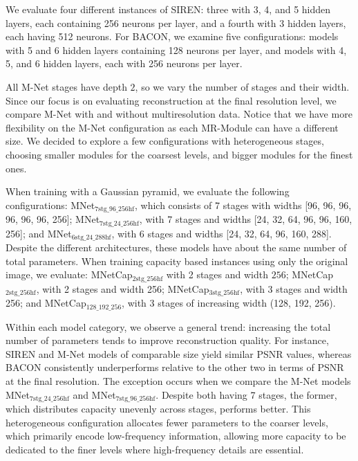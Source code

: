 We evaluate four different instances of SIREN: three with 3, 4, and 5 hidden layers, each containing 256 neurons per layer, and a fourth with 3 hidden layers, each having 512 neurons. For BACON, we examine five configurations: models with 5 and 6 hidden layers containing 128 neurons per layer, and models with 4, 5, and 6 hidden layers, each with 256 neurons per layer.

All M-Net stages have depth $2$, so we vary the number of stages and their width. Since our focus is on evaluating reconstruction at the final resolution level, we compare M-Net with and without multiresolution data. Notice that we have more flexibility on the M-Net configuration as each MR-Module can have a different size. We decided to explore a few configurations with heterogeneous stages, choosing smaller modules for the coarsest levels, and bigger modules for the finest ones.

When training with a Gaussian pyramid, we evaluate the following configurations: MNet$_\text{7stg\_96\_256hf}$, which consists of 7 stages with widths [96, 96, 96, 96, 96, 96, 256]; MNet$_\text{7stg\_24\_256hf}$, with 7 stages and widths [24, 32, 64, 96, 96, 160, 256]; and MNet$_\text{6stg\_24\_288hf}$, with 6 stages and widths [24, 32, 64, 96, 160, 288]. Despite the different architectures, these models have about the same number of total parameters. When training capacity based instances using only the original image, we evaluate: MNetCap$_\text{2stg\_256hf}$  with 2 stages and width $256$; MNetCap$_\text{2stg\_256hf}$, with 2 stages and width 256; MNetCap$_\text{3stg\_256hf}$, with 3 stages and width 256; and MNetCap$_\text{128\_192\_256}$, with 3 stages of increasing width (128, 192, 256).

Within each model category, we observe a general trend: increasing the total number of parameters tends to improve reconstruction quality. For instance, SIREN and M-Net models of comparable size yield similar PSNR values, whereas BACON consistently underperforms relative to the other two in terms of PSNR at the final resolution. The exception occurs when we compare the M-Net models MNet$_\text{7stg\_24\_256hf}$ and MNet$_\text{7stg\_96\_256hf}$. Despite both having 7 stages, the former, which distributes capacity unevenly across stages, performs better. This heterogeneous configuration allocates fewer parameters to the coarser levels, which primarily encode low-frequency information, allowing more capacity to be dedicated to the finer levels where high-frequency details are essential. 

